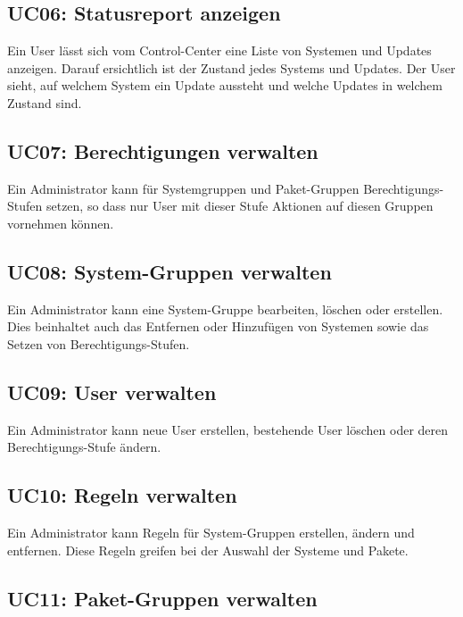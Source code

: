 \subsection*{UC06: Statusreport anzeigen}
\label{sec:uc_06}

Ein User lässt sich vom Control-Center eine Liste von Systemen und Updates anzeigen. Darauf ersichtlich ist der Zustand jedes Systems und Updates. Der User sieht, auf welchem System ein Update aussteht und welche Updates in welchem Zustand sind.

\subsection*{UC07: Berechtigungen verwalten}
\label{sec:uc_07}

Ein Administrator kann für Systemgruppen und Paket-Gruppen Berechtigungs-Stufen setzen, so dass nur User mit dieser Stufe Aktionen auf diesen Gruppen vornehmen können.

\subsection*{UC08: System-Gruppen verwalten}
\label{sec:uc_08}

Ein Administrator kann eine System-Gruppe bearbeiten, löschen oder erstellen. Dies beinhaltet auch das Entfernen oder Hinzufügen von Systemen sowie das Setzen von Berechtigungs-Stufen.

\subsection*{UC09: User verwalten}
\label{sec:uc_09}

Ein Administrator kann neue User erstellen, bestehende User löschen oder deren Berechtigungs-Stufe ändern.

\subsection*{UC10: Regeln verwalten}
\label{sec:uc_10}

Ein Administrator kann Regeln für System-Gruppen erstellen, ändern und entfernen. Diese Regeln greifen bei der Auswahl der Systeme und Pakete.

\subsection*{UC11: Paket-Gruppen verwalten}
\label{sec:uc_11}

